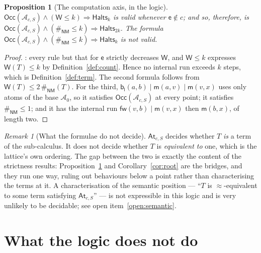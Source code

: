 \documentclass[11pt]{article}
\theoremstyle{plain}
\newtheorem{proposition}[theorem]{Proposition}
\theoremstyle{definition}
\theoremstyle{remark}
\newtheorem{remark}[theorem]{Remark}
\newcommand{\bisim}{\approx}
\newcommand{\mm}{\mathsf{m}}
\newcommand{\fw}{\mathsf{fw}}
\newcommand{\bl}{\mathsf{b}_{\mathsf{l}}}
\newcommand{\ev}{\mathsf{e}}
\newcommand{\Occ}{\mathsf{Occ}}
\newcommand{\Atm}{\mathcal{A}}
\newcommand{\shp}{\mathsf{NM}}
\newcommand{\Wt}{\mathsf{W}}
\begin{document}
\begin{proposition}[The computation axis, in the logic]
\label{prop:compaxis}
$\Occ(\Atm_{c,S}) \wedge (\Wt \leq k) \Rightarrow \mathsf{Halts}_{k}$ is
valid whenever $\ev \notin c$; and so, therefore, is
$\Occ(\Atm_{c,S}) \wedge (\#_{\shp} \leq k) \Rightarrow \mathsf{Halts}_{2k}$.
The formula $\Occ(\Atm_{c,S}) \wedge (\#_{\shp} \leq k) \Rightarrow
\mathsf{Halts}_{k}$ is not valid.
\end{proposition}

\begin{proof}
\cite[Lem.~9.2]{rhocomb3}: every rule but that for $\ev$ strictly decreases
$\Wt$, and $\Wt \leq k$ expresses $\Wt(T) \leq k$ by
Definition~\ref{def:count}. Hence no internal run exceeds $k$ steps, which is
Definition~\ref{def:term}. The second formula follows from
$\Wt(T) \leq 2\,\#_{\shp}(T)$. For the third, $\bl(a,b) \mid \mm(a,v) \mid
\mm(v,x)$ uses only atoms of the base $\Atm_{0}$, so it satisfies $\Occ(\Atm_{c,S})$ at
every point; it satisfies $\#_{\shp} \leq 1$; and it has the internal run
$\fw(v,b) \mid \mm(v,x)$ then $\mm(b,x)$, of length two.
\end{proof}

\begin{remark}[What the formulae do not decide]
\label{rem:notdecide}
$\mathsf{At}_{c,S}$ decides whether $T$ \emph{is} a term of the sub-calculus.
It does not decide whether $T$ is \emph{equivalent to} one, which is the
lattice's own ordering. The gap between the two is exactly the content of the
strictness results: Proposition~\ref{prop:compaxis} and
Corollary~\ref{cor:root} are the bridges, and they run one way, ruling out
behaviours below a point rather than characterising the terms at it. A
characterisation of the semantic position --- ``$T$ is $\bisim$-equivalent to
some term satisfying $\mathsf{At}_{c,S}$'' --- is not expressible in this logic
and is very unlikely to be decidable; see open item~\ref{open:semantic}.
\end{remark}

\section{What the logic does not do}
\label{sec:notdo}
\end{document}
